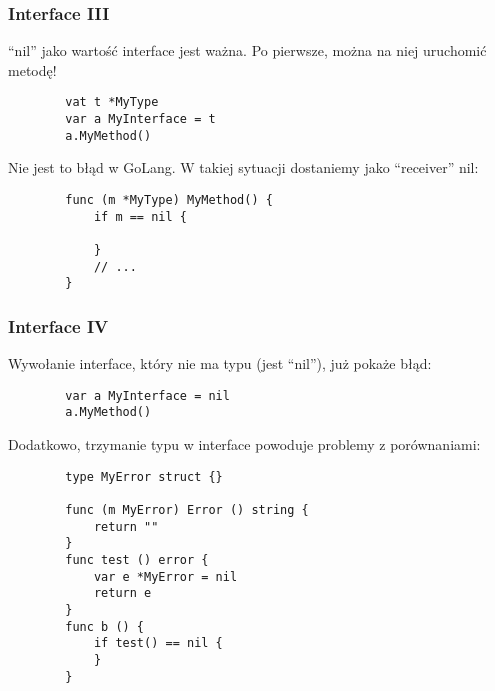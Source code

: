 \documentclass[10pt]{beamer}
\newcommand{\quotes}[1]{``#1''}
\begin{document}
\begin{frame}[fragile]
    \frametitle{Interface III}
    \quotes{nil} jako wartość interface jest ważna. Po pierwsze, można na niej uruchomić
    metodę!

    \begin{verbatim}
        vat t *MyType
        var a MyInterface = t
        a.MyMethod()
    \end{verbatim}

    Nie jest to błąd w GoLang. W takiej sytuacji dostaniemy jako \quotes{receiver} nil:

    \begin{verbatim}
        func (m *MyType) MyMethod() {
            if m == nil {

            }
            // ...
        }
    \end{verbatim}
\end{frame}

\begin{frame}[fragile]
    \frametitle{Interface IV}
    Wywołanie interface, który nie ma typu (jest \quotes{nil}), już pokaże błąd:

    \begin{verbatim}
        var a MyInterface = nil
        a.MyMethod()
    \end{verbatim}

    Dodatkowo, trzymanie typu w interface powoduje problemy z porównaniami:
    \begin{verbatim}
        type MyError struct {}

        func (m MyError) Error () string {
            return ""
        }
        func test () error {
            var e *MyError = nil
            return e
        }
        func b () {
            if test() == nil {
            }
        }
    \end{verbatim}
\end{frame}
\end{document}
